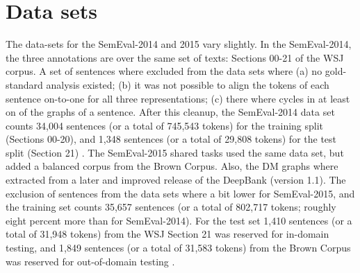 \section{Data sets}
\label{sec:data-sets}

The data-sets for the SemEval-2014 and 2015 vary slightly. In the SemEval-2014, the three annotations are over the same set of texts: Sections 00-21 of the WSJ corpus. A set of sentences where excluded from the data sets where (a) no gold-standard analysis existed; (b) it was not possible to align the tokens of each sentence on-to-one for all three representations; (c) there where cycles in at least on of the graphs of a sentence. After this cleanup, the SemEval-2014 data set counts 34,004 sentences (or a total of 745,543 tokens) for the training split (Sections 00-20), and 1,348 sentences (or a total of 29,808 tokens) for the test split (Section 21) \cite{Oepen:14}. The SemEval-2015 shared tasks used the same data set, but added a balanced corpus from the Brown Corpus. Also, the DM graphs where extracted from a later and improved release of the DeepBank (version 1.1). The exclusion of sentences from the data sets where a bit lower for SemEval-2015, and the training set counts 35,657 sentences (or a total of 802,717 tokens; roughly eight percent more than for SemEval-2014). For the test set 1,410 sentences (or a total of 31,948 tokens) from the WSJ Section 21 was reserved for in-domain testing, and 1,849 sentences (or a total of 31,583 tokens) from the Brown Corpus was reserved for out-of-domain testing \cite{Oepen:15}.

